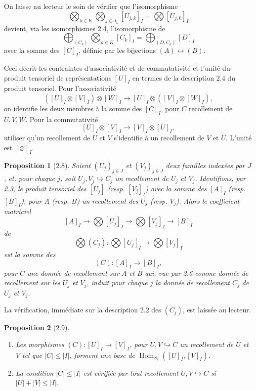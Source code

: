 \documentclass[11pt]{article}
\newcommand{\Hom}{\operatorname{Hom}}
\theoremstyle{deligne}
\newtheorem*{proposition*}{Proposition}
\newcommand{\para}[1]{\vspace{0.65em}\noindent{\bfseries #1}\quad}
\begin{document}
On laisse au lecteur le soin de vérifier que l'isomorphisme
\[
  \bigotimes_{k\in K}\bigotimes_{j\in J_k}[U_{j,k}]_I
  =
  \bigotimes [U_{j,k}]_I
\]
devient, via les isomorphismes 2.4, l'isomorphisme de
\[
  \bigoplus_{(C_k)}\bigotimes_{k\in K}[C_k]_I
  =
  \bigoplus_{(D,C_k)}[D]_I
\]
avec la somme des \([C]_I\), définie par les bijections \((A)\leftrightarrow(B)\).

\para{2.7.}
Ceci décrit les contraintes d'associativité et de commutativité et l'unité du produit tensoriel de représentations \([U]_I\) en termes de la description 2.4 du produit tensoriel. Pour l'associativité
\[
  ([U]_I\otimes[V]_I)\otimes[W]_I
  \longrightarrow
  [U]_I\otimes([V]_I\otimes[W]_I),
\]
on identifie les deux membres à la somme des \([C]_I\), pour \(C\) recollement de \(U,V,W\). Pour la commutativité
\[
  [U]_I\otimes[V]_I\longrightarrow [V]_I\otimes[U]_I,
\]
utiliser qu'un recollement de \(U\) et \(V\) s'identifie à un recollement de \(V\) et \(U\). L'unité est \([\varnothing]_I\).

\begin{proposition*}[2.8]
Soient \((U_j)_{j\in J}\) et \((V_j)_{j\in J}\) deux familles indexées par \(J\), et, pour chaque \(j\), soit \(U_j,V_j\hookrightarrow C_j\) un recollement de \(U_j\) et \(V_j\). Identifions, par 2.3, le produit tensoriel des \([U_j]\) (resp. \([V_j]_I\)) avec la somme des \([A]_I\) (resp. \([B]_I\)), pour \(A\) (resp. \(B\)) un recollement des \(U_j\) (resp. \(V_j\)). Alors le coefficient matriciel
\[
  [A]_I\longrightarrow \bigotimes[U_j]_I
  \longrightarrow \bigotimes[V_j]_I
  \longrightarrow [B]_I
\]
de
\[
  \bigotimes(C_j):\bigotimes[U_j]_I\longrightarrow \bigotimes[V_j]_I
\]
est la somme des
\[
  (C):[A]_I\longrightarrow[B]_I,
\]
pour \(C\) une donnée de recollement sur \(A\) et \(B\) qui, vue par 2.6 comme donnée de recollement sur les \(U_j\) et \(V_j\), induit pour chaque \(j\) la donnée de recollement \(C_j\) de \(U_j\) et \(V_j\).
\end{proposition*}

La vérification, immédiate sur la description 2.2 des \((C_j)\), est laissée au lecteur.

\begin{proposition*}[2.9]
\begin{enumerate}[label=(\roman*)]
\item Les morphismes \((C):[U]_I\to[V]_I\), pour \(U,V\hookrightarrow C\) un recollement de \(U\) et \(V\) tel que \(|C|\le |I|\), forment une base de \(\Hom_{S_I}([U]_I,[V]_I)\).
\item La condition \(|C|\le |I|\) est vérifiée par tout recollement \(U,V\hookrightarrow C\) si \(|U|+|V|\le |I|\).
\end{enumerate}
\end{proposition*}
\end{document}
